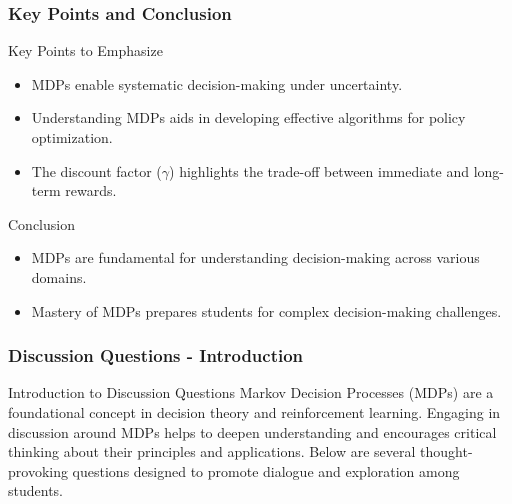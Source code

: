 \documentclass[aspectratio=169]{beamer}
\begin{document}
\begin{frame}[fragile]
    \frametitle{Key Points and Conclusion}
    \begin{block}{Key Points to Emphasize}
        \begin{itemize}
            \item MDPs enable systematic decision-making under uncertainty.
            \item Understanding MDPs aids in developing effective algorithms for policy optimization.
            \item The discount factor ($\gamma$) highlights the trade-off between immediate and long-term rewards.
        \end{itemize}
    \end{block}

    \begin{block}{Conclusion}
        \begin{itemize}
            \item MDPs are fundamental for understanding decision-making across various domains.
            \item Mastery of MDPs prepares students for complex decision-making challenges.
        \end{itemize}
    \end{block}
\end{frame}

\begin{frame}[fragile]
    \frametitle{Discussion Questions - Introduction}
    \begin{block}{Introduction to Discussion Questions}
        Markov Decision Processes (MDPs) are a foundational concept in decision theory and reinforcement learning. Engaging in discussion around MDPs helps to deepen understanding and encourages critical thinking about their principles and applications. Below are several thought-provoking questions designed to promote dialogue and exploration among students.
    \end{block}
\end{frame}
\end{document}
